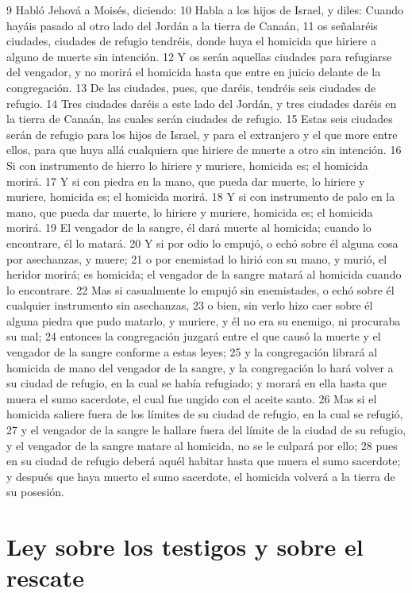 9 Habló Jehová a Moisés, diciendo:
10 Habla a los hijos de Israel, y diles: Cuando hayáis pasado al otro lado del Jordán a la tierra de Canaán,
11 os señalaréis ciudades, ciudades de refugio tendréis, donde huya el homicida que hiriere a alguno de muerte sin intención.
12 Y os serán aquellas ciudades para refugiarse del vengador, y no morirá el homicida hasta que entre en juicio delante de la congregación.
13 De las ciudades, pues, que daréis, tendréis seis ciudades de refugio.
14 Tres ciudades daréis a este lado del Jordán, y tres ciudades daréis en la tierra de Canaán, las cuales serán ciudades de refugio.
15 Estas seis ciudades serán de refugio para los hijos de Israel, y para el extranjero y el que more entre ellos, para que huya allá cualquiera que hiriere de muerte a otro sin intención.
16 Si con instrumento de hierro lo hiriere y muriere, homicida es; el homicida morirá.
17 Y si con piedra en la mano, que pueda dar muerte, lo hiriere y muriere, homicida es; el homicida morirá.
18 Y si con instrumento de palo en la mano, que pueda dar muerte, lo hiriere y muriere, homicida es; el homicida morirá.
19 El vengador de la sangre, él dará muerte al homicida; cuando lo encontrare, él lo matará.
20 Y si por odio lo empujó, o echó sobre él alguna cosa por asechanzas, y muere;
21 o por enemistad lo hirió con su mano, y murió, el heridor morirá; es homicida; el vengador de la sangre matará al homicida cuando lo encontrare. 
22 Mas si casualmente lo empujó sin enemistades, o echó sobre él cualquier instrumento sin asechanzas,
23 o bien, sin verlo hizo caer sobre él alguna piedra que pudo matarlo, y muriere, y él no era su enemigo, ni procuraba su mal;
24 entonces la congregación juzgará entre el que causó la muerte y el vengador de la sangre conforme a estas leyes;
25 y la congregación librará al homicida de mano del vengador de la sangre, y la congregación lo hará volver a su ciudad de refugio, en la cual se había refugiado; y morará en ella hasta que muera el sumo sacerdote, el cual fue ungido con el aceite santo.
26 Mas si el homicida saliere fuera de los límites de su ciudad de refugio, en la cual se refugió,
27 y el vengador de la sangre le hallare fuera del límite de la ciudad de su refugio, y el vengador de la sangre matare al homicida, no se le culpará por ello;
28 pues en su ciudad de refugio deberá aquél habitar hasta que muera el sumo sacerdote; y después que haya muerto el sumo sacerdote, el homicida volverá a la tierra de su posesión.
\section*{Ley sobre los testigos y sobre el rescate}


